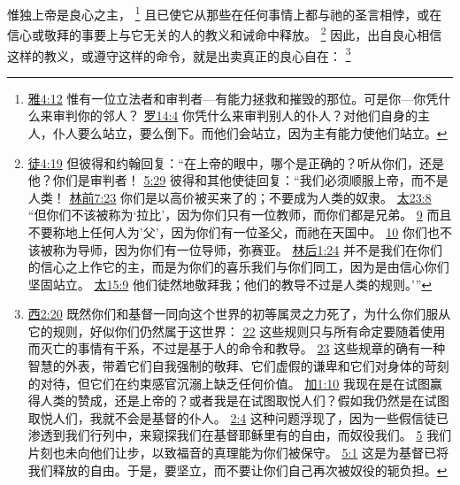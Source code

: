 \documentclass[12pt, a4paper, oneside]{ctexart}
\newcounter{parnum}[section]
\newcommand{\N}{%
   \noindent\refstepcounter{parnum}%
    \makebox[\parindent][l]{\textbf{\arabic{parnum}.}}}
\begin{document}
\N 惟独上帝是良心之主，
	\footnote {
		\href{https://biblehub.com/james/4-12.htm}{雅4:12} 惟有一位立法者和审判者---有能力拯救和摧毁的那位。可是你---你凭什么来审判你的邻人？
		\href{https://biblehub.com/romans/14-4.htm}{罗14:4} 你凭什么来审判别人的仆人？对他们自身的主人，仆人要么站立，要么倒下。而他们会站立，因为主有能力使他们站立。
	}
	且已使它从那些在任何事情上都与祂的圣言相悖，或在信心或敬拜的事要上与它无关的人的教义和诫命中释放。
	\footnote {
		\href{https://biblehub.com/acts/4-19.htm}{徒4:19} 但彼得和约翰回复：“在上帝的眼中，哪个是正确的？听从你们，还是他？你们是审判者！
		\href{https://biblehub.com/acts/5-29.htm}{5:29} 彼得和其他使徒回复：“我们必须顺服上帝，而不是人类！ 
        \href{https://biblehub.com/1_corinthians/7-23.htm}{林前7:23} 你们是以高价被买来了的；不要成为人类的奴隶。
		\href{https://biblehub.com/matthew/23-8.htm}{太23:8} “但你们不该被称为‘拉比’，因为你们只有一位教师，而你们都是兄弟。
		\href{https://biblehub.com/matthew/23-9.htm}{9} 而且不要称地上任何人为'父'，因为你们有一位圣父，而祂在天国中。
		\href{https://biblehub.com/matthew/23-10.htm}{10} 你们也不该被称为导师，因为你们有一位导师，弥赛亚。
		\href{https://biblehub.com/2_corinthians/1-24.htm}{林后1:24} 并不是我们在你们的信心之上作它的主，而是为你们的喜乐我们与你们同工，因为是由信心你们坚固站立。
		\href{https://biblehub.com/matthew/15-9.htm}{太15:9} 他们徒然地敬拜我；他们的教导不过是人类的规则。’”
	}
	因此，出自良心相信这样的教义，或遵守这样的命令，就是出卖真正的良心自在：
	\footnote {
		\href{https://biblehub.com/colossians/2-20.htm}{西2:20} 既然你们和基督一同向这个世界的初等属灵之力死了，为什么你们服从它的规则，好似你们仍然属于这世界：
		\href{https://biblehub.com/colossians/2-22.htm}{22} 这些规则只与所有命定要随着使用而灭亡的事情有干系，不过是基于人的命令和教导。
		\href{https://biblehub.com/colossians/2-23.htm}{23} 这些规章的确有一种智慧的外表，带着它们自我强制的敬拜、它们虚假的谦卑和它们对身体的苛刻的对待，但它们在约束感官沉溺上缺乏任何价值。
		\href{https://biblehub.com/galatians/1-10.htm}{加1:10} 我现在是在试图赢得人类的赞成，还是上帝的？或者我是在试图取悦人们？假如我仍然是在试图取悦人们，我就不会是基督的仆人。
		\href{https://biblehub.com/galatians/2-4.htm}{2:4} 这种问题浮现了，因为一些假信徒已渗透到我们行列中，来窥探我们在基督耶稣里有的自由，而奴役我们。
		\href{https://biblehub.com/galatians/2-5.htm}{5} 我们片刻也未向他们让步，以致福音的真理能为你们被保守。
		\href{https://biblehub.com/galatians/5-1.htm}{5:1} 这是为基督已将我们释放的自由。于是，要坚立，而不要让你们自己再次被奴役的轭负担。
	}
\end{document}
